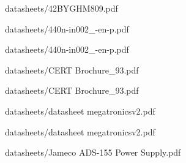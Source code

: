 

            {datasheets/42BYGHM809.pdf}

            {datasheets/440n-in002_-en-p.pdf}


            {datasheets/440n-in002_-en-p.pdf}

            {datasheets/CERT Brochure_93.pdf}


            {datasheets/CERT Brochure_93.pdf}

            {datasheets/datasheet megatronicsv2.pdf}


            {datasheets/datasheet megatronicsv2.pdf}

            {datasheets/Jameco ADS-155 Power Supply.pdf}


